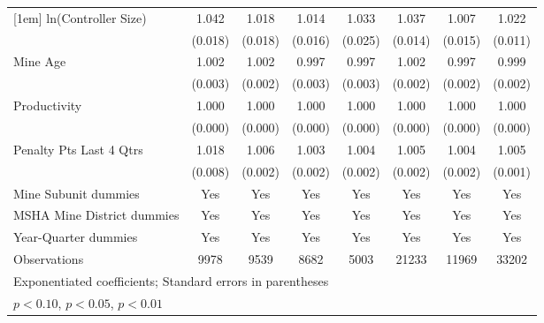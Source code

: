 {\begin{tabular}{l*{7}{c}}
[1em]
ln(Controller Size)      &       1.042\sym{**} &       1.018         &       1.014         &       1.033         &       1.037\sym{***}&       1.007         &       1.022\sym{**} \\
                         &     (0.018)         &     (0.018)         &     (0.016)         &     (0.025)         &     (0.014)         &     (0.015)         &     (0.011)         \\
[1em]
Mine Age                 &       1.002         &       1.002         &       0.997         &       0.997         &       1.002         &       0.997         &       0.999         \\
                         &     (0.003)         &     (0.002)         &     (0.003)         &     (0.003)         &     (0.002)         &     (0.002)         &     (0.002)         \\
[1em]
Productivity             &       1.000         &       1.000         &       1.000         &       1.000         &       1.000\sym{*}  &       1.000         &       1.000         \\
                         &     (0.000)         &     (0.000)         &     (0.000)         &     (0.000)         &     (0.000)         &     (0.000)         &     (0.000)         \\
[1em]
Penalty Pts Last 4 Qtrs  &       1.018\sym{**} &       1.006\sym{***}&       1.003         &       1.004         &       1.005\sym{***}&       1.004\sym{**} &       1.005\sym{***}\\
                         &     (0.008)         &     (0.002)         &     (0.002)         &     (0.002)         &     (0.002)         &     (0.002)         &     (0.001)         \\
[1em]
Mine Subunit dummies     &         Yes         &         Yes         &         Yes         &         Yes         &         Yes         &         Yes         &         Yes         \\
[1em]
MSHA Mine District dummies&         Yes         &         Yes         &         Yes         &         Yes         &         Yes         &         Yes         &         Yes         \\
[1em]
Year-Quarter dummies     &         Yes         &         Yes         &         Yes         &         Yes         &         Yes         &         Yes         &         Yes         \\
\hline
Observations             &        9978         &        9539         &        8682         &        5003         &       21233         &       11969         &       33202         \\
\hline\hline
\multicolumn{8}{l}{\footnotesize Exponentiated coefficients; Standard errors in parentheses}\\
\multicolumn{8}{l}{\footnotesize \sym{*} \(p<0.10\), \sym{**} \(p<0.05\), \sym{***} \(p<0.01\)}\\
\end{tabular}
}
